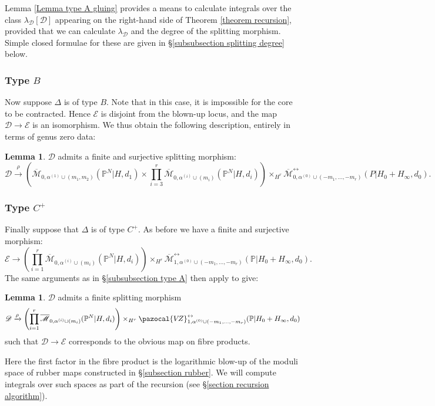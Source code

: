 \documentclass[11pt]{amsart}
\newcommand{\PP}{\mathbb P}
\newcommand{\VZ}{\pazocal{V\!Z}}
\renewcommand{\to}{\rightarrow}
\newcommand{\Mcal}{\mathcal{M}}
\newcommand{\Dcal}{\mathcal{D}}
\newcommand{\Ecal}{\mathcal{E}}
\newcommand{\ol}[1]{\overline{#1}}
\theoremstyle{definition}
\newtheorem{lemma}[thm]{Lemma}
\theoremstyle{definition}
\begin{document}
Lemma \ref{Lemma type A gluing} provides a means to calculate integrals over the class $\lambda_\Dcal[\Dcal]$ appearing on the right-hand side of Theorem \ref{theorem recursion}, provided that we can calculate $\lambda_\Dcal$ and the degree of the splitting morphism. Simple closed formulae for these are given in \S \ref{subsubsection splitting degree} below.

\subsubsection{Type $B$}
Now suppose $\Delta$ is of type $B$. Note that in this case, it is impossible for the core to be contracted. Hence $\Ecal$ is disjoint from the blown-up locus, and the map $\Dcal \to \Ecal$ is an isomorphism. We thus obtain the following description, entirely in terms of genus zero data:
\begin{lemma} $\Dcal$ admits a finite and surjective splitting morphism:
\begin{equation*} \Dcal \xrightarrow{\rho} \left(\ol\Mcal_{0,\alpha^{(1)}\cup(m_1,m_2)}(\PP^N|H,d_1)\times\prod_{i=3}^r \ol\Mcal_{0,\alpha^{(i)}\cup(m_i)}(\PP^N|H,d_i)\right) \times_{H^r} \ol\Mcal^{\leftrightarrow}_{0,\alpha^{(0)}\cup(-m_1,\ldots,-m_r)}(P|H_0+H_\infty,d_0).\end{equation*}\end{lemma}

\subsubsection{Type $C^+$} \label{subsubsection type C+} Finally suppose that $\Delta$ is of type $C^+$. As before we have a finite and surjective morphism:
\begin{equation*} \Ecal \to  \left( \prod_{i=1}^r \ol\Mcal_{0,\alpha^{(i)}\cup(m_i)}(\PP^N|H,d_i) \right) \times_{H^r} \ol\Mcal^{\leftrightarrow}_{1,\alpha^{(0)}\cup(-m_1,\ldots,-m_r)}(\mathbb{P}|H_0+H_\infty,d_0). \end{equation*}
The same arguments as in \S \ref{subsubsection type A} then apply to give:
\begin{lemma} $\Dcal$ admits a finite splitting morphism
\begin{equation*}\Dcal \xrightarrow{\rho} \left( \prod_{i=1}^r \ol\Mcal_{0,\alpha^{(i)}\cup(m_i)}(\PP^N|H,d_i) \right) \times_{H^r} \VZ^{\leftrightarrow}_{1,\alpha^{(0)}\cup(-m_1,\ldots,-m_r)}(\mathbb{P}|H_0+H_\infty,d_0)\end{equation*}
such that $\Dcal \to \Ecal$ corresponds to the obvious map on fibre products.\end{lemma}
Here the first factor in the fibre product is the logarithmic blow-up of the moduli space of rubber maps constructed in \S \ref{subsection rubber}. We will compute integrals over such spaces as part of the recursion (see \S \ref{section recursion algorithm}).
\end{document}
